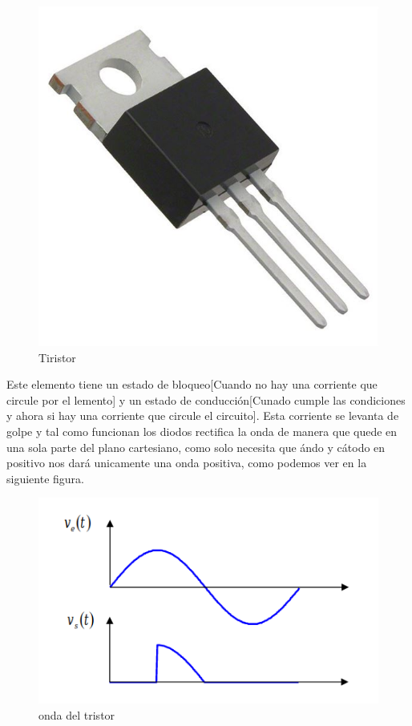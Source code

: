 \documentclass[letterpaper]{article}
\begin{document}
\begin{Large}
\begin{figure}[hbtp]
\caption{Tiristor}
\centering
\includegraphics[scale=.3]{Imagenes/tiristor-2n6509.jpg}
\end{figure}

Este elemento tiene un estado de bloqueo[Cuando no hay una corriente que circule por el lemento] y un estado de conducción[Cunado cumple las condiciones y ahora si hay una corriente que circule el circuito]. Esta corriente se levanta de golpe y tal como funcionan los diodos rectifica la onda de manera que quede en una sola parte del plano cartesiano, como solo necesita que ándo y cátodo en positivo nos dará unicamente una onda positiva, como podemos ver en la siguiente figura.\\

\begin{figure}[hbtp]
\caption{onda del tristor}
\centering
\includegraphics[scale=.5]{Imagenes/onda.png}
\end{figure}


\end{Large}
\end{document}
